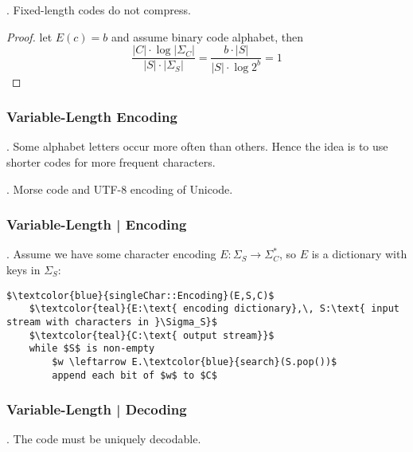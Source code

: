 \documentclass{article}
\begin{document}
\begin{discovery}[].
    Fixed-length codes do not compress. 
\end{discovery}

\begin{proof}
    let $E(c) = b$ and assume binary code alphabet, then 
    \[ \frac{ |C| \cdot \log |\Sigma_C| }{ |S| \cdot |\Sigma_S| } = \frac{b \cdot |S|}{|S| \cdot \log 2^b} = 1 \]
\end{proof}

\subsubsection{Variable-Length Encoding}

\begin{comm}[].
    Some alphabet letters occur more often than others. Hence the idea is to use shorter codes for more frequent characters. 
\end{comm}

\begin{examplee}[].
    Morse code and UTF-8 encoding of Unicode. 
\end{examplee}

\subsubsection{Variable-Length | Encoding}

\begin{codes}[Encoding].
    Assume we have some character encoding $E : \Sigma_S \rightarrow \Sigma_C^*$, so $E$ is a dictionary with keys in $\Sigma_S$: 
    \begin{lstlisting}[style=cppstyle, mathescape=true]
    $\textcolor{blue}{singleChar::Encoding}(E,S,C)$
    $\textcolor{teal}{E:\text{ encoding dictionary},\, S:\text{ input stream with characters in }\Sigma_S}$
    $\textcolor{teal}{C:\text{ output stream}}$
    while $S$ is non-empty
        $w \leftarrow E.\textcolor{blue}{search}(S.pop())$
        append each bit of $w$ to $C$
    \end{lstlisting}
\end{codes}

\subsubsection{Variable-Length | Decoding}

\begin{comm}[].
    The code must be uniquely decodable. 
\end{comm}
\end{document}
